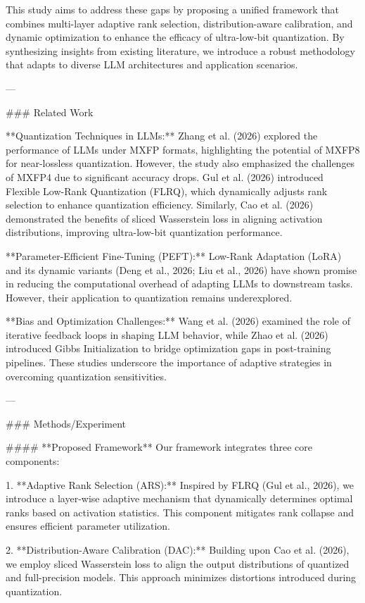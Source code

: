 This study aims to address these gaps by proposing a unified framework that combines multi-layer adaptive rank selection, distribution-aware calibration, and dynamic optimization to enhance the efficacy of ultra-low-bit quantization. By synthesizing insights from existing literature, we introduce a robust methodology that adapts to diverse LLM architectures and application scenarios.

---

### Related Work

**Quantization Techniques in LLMs:**  
Zhang et al. (2026) explored the performance of LLMs under MXFP formats, highlighting the potential of MXFP8 for near-lossless quantization. However, the study also emphasized the challenges of MXFP4 due to significant accuracy drops. Gul et al. (2026) introduced Flexible Low-Rank Quantization (FLRQ), which dynamically adjusts rank selection to enhance quantization efficiency. Similarly, Cao et al. (2026) demonstrated the benefits of sliced Wasserstein loss in aligning activation distributions, improving ultra-low-bit quantization performance.

**Parameter-Efficient Fine-Tuning (PEFT):**  
Low-Rank Adaptation (LoRA) and its dynamic variants (Deng et al., 2026; Liu et al., 2026) have shown promise in reducing the computational overhead of adapting LLMs to downstream tasks. However, their application to quantization remains underexplored.

**Bias and Optimization Challenges:**  
Wang et al. (2026) examined the role of iterative feedback loops in shaping LLM behavior, while Zhao et al. (2026) introduced Gibbs Initialization to bridge optimization gaps in post-training pipelines. These studies underscore the importance of adaptive strategies in overcoming quantization sensitivities.

---

### Methods/Experiment  

#### **Proposed Framework**  
Our framework integrates three core components:  

1. **Adaptive Rank Selection (ARS):**  
   Inspired by FLRQ (Gul et al., 2026), we introduce a layer-wise adaptive mechanism that dynamically determines optimal ranks based on activation statistics. This component mitigates rank collapse and ensures efficient parameter utilization.

2. **Distribution-Aware Calibration (DAC):**  
   Building upon Cao et al. (2026), we employ sliced Wasserstein loss to align the output distributions of quantized and full-precision models. This approach minimizes distortions introduced during quantization.

